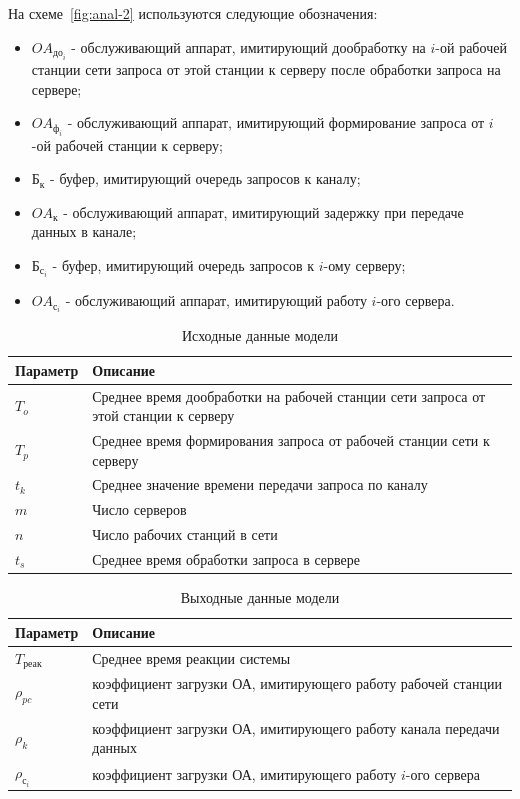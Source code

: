 \documentclass[russian,utf8,emptystyle]{eskdtext}
\begin{document}
На схеме~\ref{fig:anal-2} используются следующие обозначения:
\begin{itemize}[label=-]
\item $OA_{\text{до}_i}$ - обслуживающий аппарат, имитирующий дообработку на $i$-ой рабочей станции сети запроса от этой станции к серверу после обработки запроса на сервере;
\item $OA_{\text{ф}_i}$ - обслуживающий аппарат, имитирующий формирование запроса от $i$-ой рабочей станции к серверу;
\item $\text{Б}_\text{к}$ - буфер, имитирующий очередь запросов к каналу;
\item $OA_\text{к}$ - обслуживающий аппарат, имитирующий задержку при передаче данных в канале;
\item $\text{Б}_{\text{с}_i}$ - буфер, имитирующий очередь запросов к $i$-ому серверу;
\item $OA_{\text{с}_i}$ - обслуживающий аппарат, имитирующий работу $i$-ого сервера.
\end{itemize}

\begin{longtable}{p{2cm}|p{15cm}}
\caption{Исходные данные модели}
\label{tab:anal-input} 
\\
Параметр & Описание \\
\hline
$T_o$ & Среднее время дообработки на рабочей станции сети запроса от этой станции к серверу \\
$T_p$ & Среднее время формирования запроса от рабочей станции сети к серверу \\
$t_k$ & Среднее значение времени передачи запроса по каналу \\
$m$   & Число серверов \\
$n$   & Число рабочих станций в сети \\
$t_s$ & Среднее время обработки запроса в сервере
\end{longtable}

\clearpage
\begin{longtable}{p{2cm}|p{15cm}}
\caption{Выходные данные модели}
\label{tab:anal-input} 
\\
Параметр & Описание \\
\hline
$T_\text{реак}$ & Среднее время реакции системы \\
$\rho_{pc}$ & коэффициент загрузки ОА, имитирующего работу рабочей станции сети \\
$\rho_k$ & коэффициент загрузки ОА, имитирующего работу канала передачи данных \\
$\rho_{\text{с}_i}$ & коэффициент загрузки ОА, имитирующего работу $i$-ого сервера \\
\end{longtable}
\end{document}
